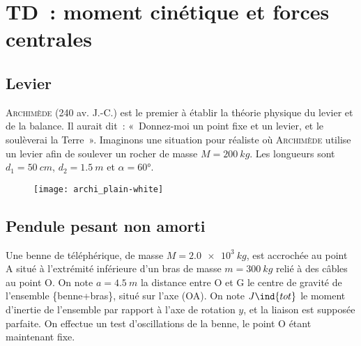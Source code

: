 \documentclass[a4paper, 10pt, final, garamond]{book}
\begin{document}
\setcounter{chapter}{7}


\chapter{TD~: moment cin\'etique et forces centrales}

\section{Levier}
\textsc{Archimède} (240 av. J.-C.) est le premier à établir la théorie physique
du levier et de la balance. Il aurait dit~: «~Donnez-moi un point fixe et un
levier, et le soulèverai la Terre~».
\smallbreak
Imaginons une situation pour réaliste où \textsc{Archimède} utilise un levier
afin de soulever un rocher de masse $M = \SI{200}{kg}$. Les longueurs sont $d_1
	= \SI{50}{cm}$, $d_2 = \SI{1.5}{m}$ et $\alpha = \ang{60}$.
\begin{figure}[htbp!]
	\centering
	\texttt{[image: archi\_plain-white]}
	\label{fig:bld_1}
\end{figure}

\section{Pendule pesant non amorti}
Une benne de téléphérique, de masse $M = \SI{2.0e3}{kg}$, est accrochée au point
A situé à l'extrémité inférieure d'un bras de masse $m = \SI{300}{kg}$ relié à
des câbles au point O. On note $a = \SI{4.5}{m}$ la distance entre O et G le
centre de gravité de l'ensemble \{benne+bras\}, situé sur l'axe (OA).
\smallbreak
On note $J\ind{tot}$ le moment d'inertie de l'ensemble par rapport à l'axe de
rotation $y$, et la liaison est supposée parfaite. On effectue un test
d'oscillations de la benne, le point O étant maintenant fixe.
\end{document}
